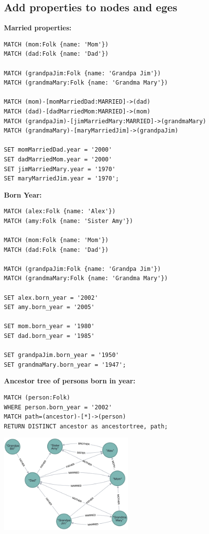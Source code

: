 \documentclass[14pt,a4paper]{extarticle}
\begin{document}
	\pagebreak

	\subsection*{Add properties to nodes and eges}
	\noindent \textbf{Married properties:}
	\begin{lstlisting}[style=sql]
MATCH (mom:Folk {name: 'Mom'})
MATCH (dad:Folk {name: 'Dad'})

MATCH (grandpaJim:Folk {name: 'Grandpa Jim'})
MATCH (grandmaMary:Folk {name: 'Grandma Mary'})

MATCH (mom)-[momMarriedDad:MARRIED]->(dad)
MATCH (dad)-[dadMarriedMom:MARRIED]->(mom)
MATCH (grandpaJim)-[jimMarriedMary:MARRIED]->(grandmaMary)
MATCH (grandmaMary)-[maryMarriedJim]->(grandpaJim)

SET momMarriedDad.year = '2000'
SET dadMarriedMom.year = '2000'
SET jimMarriedMary.year = '1970'
SET maryMarriedJim.year = '1970';
	\end{lstlisting}

	\noindent \textbf{Born Year:}
	\begin{lstlisting}[style=sql]
MATCH (alex:Folk {name: 'Alex'})
MATCH (amy:Folk {name: 'Sister Amy'})

MATCH (mom:Folk {name: 'Mom'})
MATCH (dad:Folk {name: 'Dad'})

MATCH (grandpaJim:Folk {name: 'Grandpa Jim'})
MATCH (grandmaMary:Folk {name: 'Grandma Mary'})

SET alex.born_year = '2002'
SET amy.born_year = '2005'

SET mom.born_year = '1980'
SET dad.born_year = '1985'

SET grandpaJim.born_year = '1950'
SET grandmaMary.born_year = '1947';
	\end{lstlisting}

	\pagebreak

	\noindent \textbf{Ancestor tree of persons born in year:}
	\begin{lstlisting}[style=sql]
MATCH (person:Folk)
WHERE person.born_year = '2002'
MATCH path=(ancestor)-[*]->(person)
RETURN DISTINCT ancestor as ancestortree, path;
	\end{lstlisting}
	\begin{center}
	\includegraphics[height=5cm]{images/at_2002.png}
	\end{center}
\end{document}

